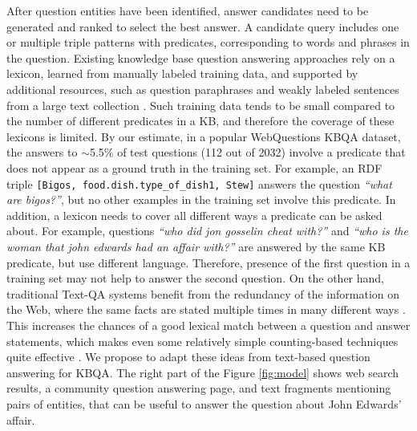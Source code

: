 After question entities have been identified, answer candidates need to be generated and ranked to select the best answer.
A candidate query includes one or multiple triple patterns with predicates, corresponding to words and phrases in the question.
Existing knowledge base question answering approaches \cite{ACCU:2015,Berant:EMNLP13,berant2014semantic,berant2015imitation,BordesCW14:emnlp,yao2014freebase} rely on a lexicon, learned from manually labeled training data, and supported by additional resources, such as question paraphrases \cite{berant2014semantic} and weakly labeled sentences from a large text collection \cite{yao2014information}.
Such training data tends to be small compared to the number of different predicates in a KB, and therefore the coverage of these lexicons is limited.
By our estimate, in a popular WebQuestions KBQA dataset, the answers to $\sim$5.5\% of test questions (112 out of 2032) involve a predicate that does not appear as a ground truth in the training set.
For example, an RDF triple \texttt{[Bigos, food.dish.type\_of\_dish1, Stew]} answers the question \textit{``what are bigos?''}, but no other examples in the training set involve this predicate.
In addition, a lexicon needs to cover all different ways a predicate can be asked about.
For example, questions \textit{``who did jon gosselin cheat with?''} and \textit{``who is the woman that john edwards had an affair with?''} are answered by the same KB predicate, but use different language.
Therefore, presence of the first question in a training set may not help to answer the second question.
On the other hand, traditional Text-QA systems benefit from the redundancy of the information on the Web, where the same facts are stated multiple times in many different ways \cite{Lin:2007:EPU:1229179.1229180}.
This increases the chances of a good lexical match between a question and answer statements, which makes even some relatively simple counting-based techniques quite effective \cite{brill2002analysis}.
We propose to adapt these ideas from text-based question answering for KBQA.
The right part of the Figure \ref{fig:model} shows web search results, a community question answering page, and text fragments mentioning pairs of entities, that can be useful to answer the question about John Edwards' affair.

